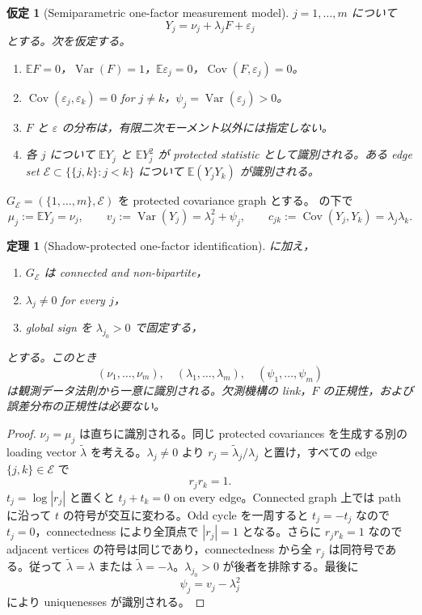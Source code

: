 \documentclass[11pt,a4paper]{ltjsarticle}
\newtheorem{assumption}{仮定}[section]
\newtheorem{theorem}{定理}[section]
\theoremstyle{remark}
\newcommand{\E}{\mathbb E}
\newcommand{\wt}{\widetilde}
\newcommand{\cE}{\mathcal E}
\newcommand{\Var}{\operatorname{Var}}
\newcommand{\Cov}{\operatorname{Cov}}
\begin{document}
\begin{assumption}[Semiparametric one-factor measurement model]\label{as:onefactor}
$j=1,\ldots,m$ について
\begin{equation}
Y_j=\nu_j+\lambda_jF+\varepsilon_j
\label{eq:onefactor}
\end{equation}
とする。次を仮定する。
\begin{enumerate}[label=(FA\arabic*)]
\item $\E F=0$，$\Var(F)=1$，$\E\varepsilon_j=0$，$\Cov(F,\varepsilon_j)=0$。
\item $\Cov(\varepsilon_j,\varepsilon_k)=0$ for $j\ne k$，$\psi_j=\Var(\varepsilon_j)>0$。
\item $F$ と $\varepsilon$ の分布は，有限二次モーメント以外には指定しない。
\item 各 $j$ について $\E Y_j$ と $\E Y_j^2$ が protected statistic として識別される。ある edge set $\cE\subset\{\{j,k\}:j<k\}$ について $\E(Y_jY_k)$ が識別される。
\end{enumerate}
\end{assumption}

$G_\cE=(\{1,\ldots,m\},\cE)$ を protected covariance graph とする。 の下で
\begin{equation}
\mu_j:=\E Y_j=\nu_j,\qquad
v_j:=\Var(Y_j)=\lambda_j^2+\psi_j,
\qquad
c_{jk}:=\Cov(Y_j,Y_k)=\lambda_j\lambda_k.
\label{eq:factorsecondmoments}
\end{equation}

\begin{theorem}[Shadow-protected one-factor identification]\label{thm:factorgraph}
 に加え，
\begin{enumerate}[label=(\roman*)]
\item $G_\cE$ は connected and non-bipartite，
\item $\lambda_j\ne0$ for every $j$，
\item global sign を $\lambda_{j_0}>0$ で固定する，
\end{enumerate}
とする。このとき
\[
(\nu_1,\ldots,\nu_m),\quad
(\lambda_1,\ldots,\lambda_m),\quad
(\psi_1,\ldots,\psi_m)
\]
は観測データ法則から一意に識別される。欠測機構の link，$F$ の正規性，および誤差分布の正規性は必要ない。
\end{theorem}

\begin{proof}
$\nu_j=\mu_j$ は直ちに識別される。同じ protected covariances を生成する別の loading vector $\wt\lambda$ を考える。$\lambda_j\ne0$ より $r_j=\wt\lambda_j/\lambda_j$ と置け，すべての edge $\{j,k\}\in\cE$ で
\[
r_jr_k=1.
\]
$t_j=\log|r_j|$ と置くと $t_j+t_k=0$ on every edge。Connected graph 上では path に沿って $t$ の符号が交互に変わる。Odd cycle を一周すると $t_j=-t_j$ なので $t_j=0$，connectedness により全頂点で $|r_j|=1$ となる。さらに $r_jr_k=1$ なので adjacent vertices の符号は同じであり，connectedness から全 $r_j$ は同符号である。従って $\wt\lambda=\lambda$ または $\wt\lambda=-\lambda$。$\lambda_{j_0}>0$ が後者を排除する。最後に
\[
\psi_j=v_j-\lambda_j^2
\]
により uniquenesses が識別される。
\end{proof}
\end{document}
